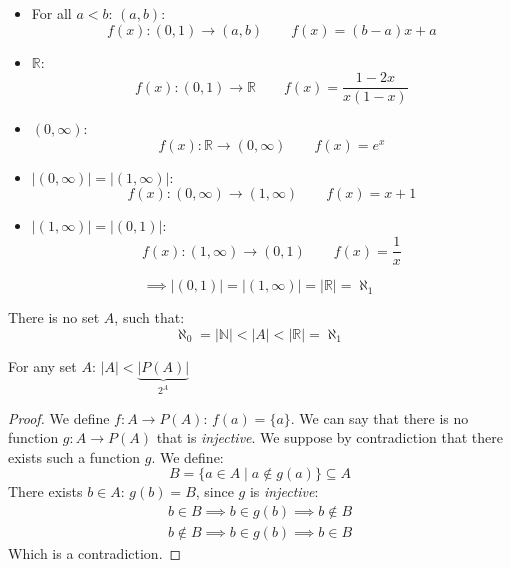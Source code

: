\documentclass[00_complete]{subfiles}
\begin{document}
\begin{itemize} \tightlist
    \item For all $a<b$: $(a,b)$:
    $$f(x):(0,1)\to (a,b) \qquad f(x)=(b-a)x+a$$
    \item $\mathbb{R}$:
    $$f(x):(0,1)\to \mathbb{R} \qquad f(x)=\frac{1-2x}{x(1-x)}$$
    \item $(0, \infty)$:
    $$f(x):\mathbb{R}\to (0,\infty) \qquad f(x)=e^x$$
    \item $|(0,\infty)|=|(1,\infty)|$:
    $$f(x):(0,\infty)\to (1,\infty) \qquad f(x)=x+1$$
    \item $|(1,\infty)|=|(0,1)|$:
    $$f(x):(1,\infty)\to (0,1) \qquad f(x)=\frac{1}{x}$$
\end{itemize}
$$\implies |(0,1)| = |(1,\infty)|=|\mathbb{R}| = \aleph_1$$
\begin{claim}
    There is no set $A$, such that:
    $$\aleph_0 =|\mathbb{N}|<|A|<|\mathbb{R}|=\aleph_1$$
\end{claim}
\begin{theorem}
    For any set $A$: $|A|<\underbrace{|P(A)|}_{2^A}$
\end{theorem}
\begin{proof}
    We define $f:A \to P(A)$: $f(a)=\{a\}$. We can say that there is no
    function $g: A \to P(A)$ that is \emph{injective}. We suppose by
    contradiction that there exists such a function $g$. We define:
    $$B=\{a \in A \mid a \notin g(a)\} \subseteq A$$
    There exists $b \in A$: $g(b)=B$, since $g$ is \emph{injective}:
    \begin{gather*}
        b \in B \implies b \in g(b) \implies b \notin B \\
        b \notin B \implies b \in g(b) \implies b \in B
    \end{gather*}
    Which is a contradiction.
\end{proof}
\end{document}
